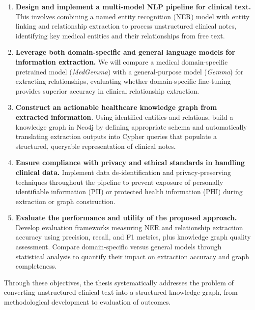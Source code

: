\begin{enumerate}
  \item \textbf{Design and implement a multi-model NLP pipeline for clinical text.} This involves combining a named entity recognition (NER) model with entity linking and relationship extraction to process unstructured clinical notes, identifying key medical entities and their relationships from free text.

  \item \textbf{Leverage both domain-specific and general language models for information extraction.} We will compare a medical domain-specific pretrained model (\emph{MedGemma}) with a general-purpose model (\emph{Gemma}) for extracting relationships, evaluating whether domain-specific fine-tuning provides superior accuracy in clinical relationship extraction.

  \item \textbf{Construct an actionable healthcare knowledge graph from extracted information.} Using identified entities and relations, build a knowledge graph in Neo4j by defining appropriate schema and automatically translating extraction outputs into Cypher queries that populate a structured, queryable representation of clinical notes.

  \item \textbf{Ensure compliance with privacy and ethical standards in handling clinical data.} Implement data de-identification and privacy-preserving techniques throughout the pipeline to prevent exposure of personally identifiable information (PII) or protected health information (PHI) during extraction or graph construction.

  \item \textbf{Evaluate the performance and utility of the proposed approach.} Develop evaluation frameworks measuring NER and relationship extraction accuracy using precision, recall, and F1 metrics, plus knowledge graph quality assessment. Compare domain-specific versus general models through statistical analysis to quantify their impact on extraction accuracy and graph completeness.
\end{enumerate}

Through these objectives, the thesis systematically addresses the problem of converting unstructured clinical text into a structured knowledge graph, from methodological development to evaluation of outcomes.


